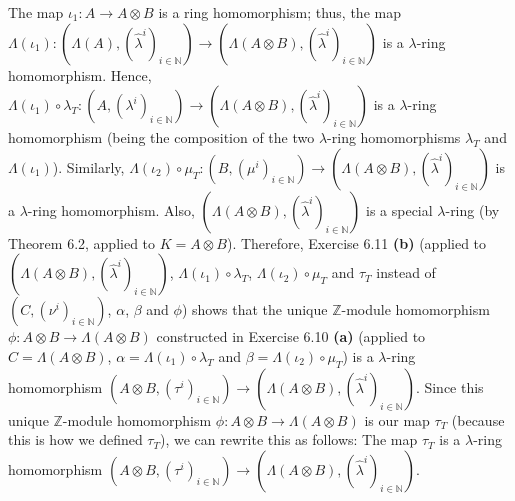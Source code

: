 \documentclass[numbers=enddot,12pt,final,onecolumn,notitlepage]{scrartcl}%
\begin{document}
The map $\iota_{1}:A\rightarrow A\otimes B$ is a ring homomorphism; thus, the
map $\Lambda\left(  \iota_{1}\right)  :\left(  \Lambda\left(  A\right)
,\left(  \widehat{\lambda}^{i}\right)  _{i\in\mathbb{N}}\right)
\rightarrow\left(  \Lambda\left(  A\otimes B\right)  ,\left(  \widehat{\lambda
}^{i}\right)  _{i\in\mathbb{N}}\right)  $ is a $\lambda$-ring homomorphism.
Hence, $\Lambda\left(  \iota_{1}\right)  \circ\lambda_{T}:\left(  A,\left(
\lambda^{i}\right)  _{i\in\mathbb{N}}\right)  \rightarrow\left(
\Lambda\left(  A\otimes B\right)  ,\left(  \widehat{\lambda}^{i}\right)
_{i\in\mathbb{N}}\right)  $ is a $\lambda$-ring homomorphism (being the
composition of the two $\lambda$-ring homomorphisms $\lambda_{T}$ and
$\Lambda\left(  \iota_{1}\right)  $). Similarly, $\Lambda\left(  \iota
_{2}\right)  \circ\mu_{T}:\left(  B,\left(  \mu^{i}\right)  _{i\in\mathbb{N}%
}\right)  \rightarrow\left(  \Lambda\left(  A\otimes B\right)  ,\left(
\widehat{\lambda}^{i}\right)  _{i\in\mathbb{N}}\right)  $ is a $\lambda$-ring
homomorphism. Also, $\left(  \Lambda\left(  A\otimes B\right)  ,\left(
\widehat{\lambda}^{i}\right)  _{i\in\mathbb{N}}\right)  $ is a special
$\lambda$-ring (by Theorem 6.2, applied to $K=A\otimes B$). Therefore,
Exercise 6.11 \textbf{(b)} (applied to $\left(  \Lambda\left(  A\otimes
B\right)  ,\left(  \widehat{\lambda}^{i}\right)  _{i\in\mathbb{N}}\right)  $,
$\Lambda\left(  \iota_{1}\right)  \circ\lambda_{T}$, $\Lambda\left(  \iota
_{2}\right)  \circ\mu_{T}$ and $\tau_{T}$ instead of $\left(  C,\left(
\nu^{i}\right)  _{i\in\mathbb{N}}\right)  $, $\alpha$, $\beta$ and $\phi$)
shows that the unique $\mathbb{Z}$-module homomorphism $\phi:A\otimes
B\rightarrow\Lambda\left(  A\otimes B\right)  $ constructed in Exercise 6.10
\textbf{(a)} (applied to $C=\Lambda\left(  A\otimes B\right)  $,
$\alpha=\Lambda\left(  \iota_{1}\right)  \circ\lambda_{T}$ and $\beta
=\Lambda\left(  \iota_{2}\right)  \circ\mu_{T}$) is a $\lambda$-ring
homomorphism $\left(  A\otimes B,\left(  \tau^{i}\right)  _{i\in\mathbb{N}%
}\right)  \rightarrow\left(  \Lambda\left(  A\otimes B\right)  ,\left(
\widehat{\lambda}^{i}\right)  _{i\in\mathbb{N}}\right)  $. Since this unique
$\mathbb{Z}$-module homomorphism $\phi:A\otimes B\rightarrow\Lambda\left(
A\otimes B\right)  $ is our map $\tau_{T}$ (because this is how we defined
$\tau_{T}$), we can rewrite this as follows: The map $\tau_{T}$ is a $\lambda
$-ring homomorphism $\left(  A\otimes B,\left(  \tau^{i}\right)
_{i\in\mathbb{N}}\right)  \rightarrow\left(  \Lambda\left(  A\otimes B\right)
,\left(  \widehat{\lambda}^{i}\right)  _{i\in\mathbb{N}}\right)  $.
\end{document}
